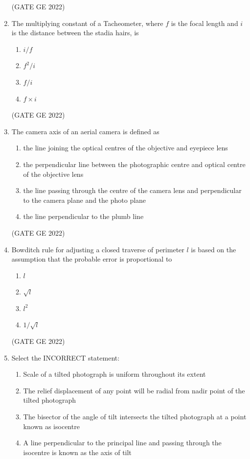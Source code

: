 \documentclass[a4paper, 11pt]{article}
\begin{document}
\begin{enumerate}
\hfill (GATE GE 2022)

\item The multiplying constant of a Tacheometer, where $f$ is the focal length and $i$ is the distance between the stadia hairs, is
\begin{enumerate}
    \item $i/f$
    \item $f^2 / i$
    \item $f / i$
    \item $f \times i$
\end{enumerate}

\hfill (GATE GE 2022)

\item The camera axis of an aerial camera is defined as
\begin{enumerate}
    \item the line joining the optical centres of the objective and eyepiece lens
    \item the perpendicular line between the photographic centre and optical centre of the objective lens
    \item the line passing through the centre of the camera lens and perpendicular to the camera plane and the photo plane
    \item the line perpendicular to the plumb line
\end{enumerate}

\hfill (GATE GE 2022)

\item Bowditch rule for adjusting a closed traverse of perimeter $l$ is based on the assumption that the probable error is proportional to
\begin{enumerate}
    \item $l$
    \item $\sqrt{l}$
    \item $l^2$
    \item $1/\sqrt{l}$
\end{enumerate}

\hfill (GATE GE 2022)

\item Select the INCORRECT statement:
\begin{enumerate}
    \item Scale of a tilted photograph is uniform throughout its extent
    \item The relief displacement of any point will be radial from nadir point of the tilted photograph
    \item The bisector of the angle of tilt intersects the tilted photograph at a point known as isocentre
    \item A line perpendicular to the principal line and passing through the isocentre is known as the axis of tilt
\end{enumerate}


\end{enumerate}
\end{document}
